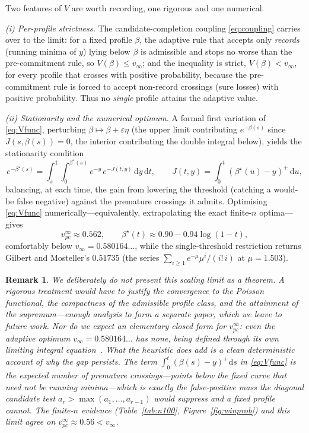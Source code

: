 \documentclass[11pt]{article}
\newtheorem{remark}{Remark}
\begin{document}
Two features of $V$ are worth recording, one rigorous and one numerical.

\emph{(i) Per-profile strictness.} The candidate-completion coupling \eqref{eq:coupling}
carries over to the limit: for a fixed profile $\beta$, the adaptive rule that accepts only
\emph{records} (running minima of $y$) lying below $\beta$ is admissible and stops no worse
than the pre-commitment rule, so $V(\beta)\le v_\infty$; and the inequality is strict,
$V(\beta)<v_\infty$, for every profile that crosses with positive probability, because the
pre-commitment rule is forced to accept non-record crossings (sure losses) with positive
probability. Thus no \emph{single} profile attains the adaptive value.

\emph{(ii) Stationarity and the numerical optimum.} A formal first variation of
\eqref{eq:Vfunc}, perturbing $\beta\mapsto\beta+\varepsilon\eta$ (the upper limit
contributing $e^{-\beta(s)}$ since $J(s,\beta(s))=0$, the interior contributing the double
integral below), yields the stationarity condition
\begin{equation}\label{eq:EL}
  e^{-\beta^\star(s)}=\int_s^1\!\!\int_0^{\beta^\star(s)}
       e^{-y}\,e^{-J(t,y)}\,\mathrm{d}y\,\mathrm{d}t ,
  \qquad J(t,y)=\int_0^t(\beta^\star(u)-y)^+\,\mathrm{d}u ,
\end{equation}
balancing, at each time, the gain from lowering the threshold (catching a would-be false
negative) against the premature crossings it admits. Optimising \eqref{eq:Vfunc}
numerically---equivalently, extrapolating the exact finite-$n$ optima---gives
\[
   v_{pc}^\infty\approx 0.562,\qquad \beta^\star(t)\approx 0.90-0.94\log(1-t),
\]
comfortably below $v_\infty=0.580164\ldots$, while the single-threshold restriction returns
Gilbert and Mosteller's $0.51735$ (the series $\sum_{i\ge1}e^{-\mu}\mu^i/(i!\,i)$ at
$\mu=1.503$).

\begin{remark}
We deliberately do \emph{not} present this scaling limit as a theorem. A rigorous
treatment would have to justify the convergence to the Poisson functional, the
compactness of the admissible profile class, and the attainment of the supremum---enough
analysis to form a separate paper, which we leave to future work. Nor do we expect an
elementary closed form for $v_{pc}^\infty$: even the adaptive optimum
$v_\infty=0.580164\ldots$ has none, being defined through its own limiting integral
equation~\cite{GnedinMiretskiy2007}. What the heuristic does add is a clean deterministic
account of \emph{why} the gap persists. The term $\int_0^t(\beta(s)-y)^+\mathrm{d}s$ in
\eqref{eq:Vfunc} is the expected number of \emph{premature} crossings---points below the
fixed curve that need not be running minima---which is exactly the false-positive mass the
diagonal candidate test $a_r>\max(a_1,\dots,a_{r-1})$ would suppress and a fixed profile
cannot. The finite-$n$ evidence (Table~\ref{tab:n100}, Figure~\ref{fig:winprob}) and this
limit agree on $v_{pc}^\infty\approx 0.56<v_\infty$.
\end{remark}
\end{document}
